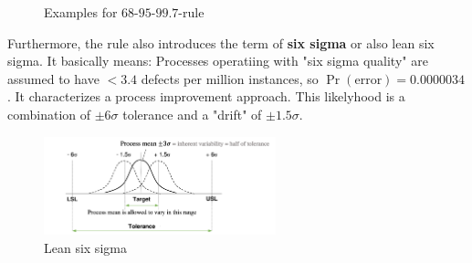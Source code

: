 \begin{figure}[H]
  \centering
  \hspace*{0.05\textwidth}
  \caption{Examples for $68$-$95$-$99.7$-rule}
  \label{fig:2_three_sigma_examples}
\end{figure}

Furthermore, the rule also introduces the term of \textbf{six sigma} or also lean six sigma. It basically means: Processes operatiing with "six sigma quality" are assumed to have $< 3.4$ defects per million instances, so $\Pr(\text{error})=0.0000034$. It characterizes a process improvement approach. This likelyhood is a combination of $\pm6\sigma$ tolerance and a "drift" of $\pm1.5\sigma$. 

\begin{figure}[H]
  \centering
  \includegraphics[width=0.6\textwidth]{assets/visualization_and_extraction/lean_six_sigma.png}
  \caption{Lean six sigma}
  \label{fig:2_lean_six_sigma}
\end{figure}
